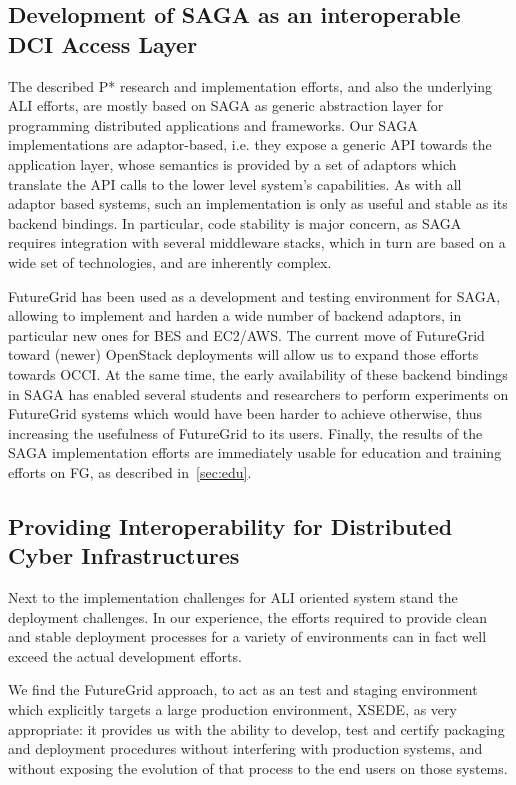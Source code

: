 \documentclass[]{paper}
\begin{document}
\subsection*{Development of SAGA as an interoperable DCI Access Layer}
\label{ssec:std_saga}

 The described P* research and implementation efforts, and also the
 underlying ALI efforts, are mostly based on SAGA as generic
 abstraction layer for programming distributed applications and
 frameworks.  Our SAGA implementations are adaptor-based, i.e. they
 expose a generic API towards the application layer, whose semantics
 is provided by a set of adaptors which translate the API calls to the
 lower level system's capabilities.  As with all adaptor based
 systems, such an implementation is only as useful and stable as its
 backend bindings.  In particular, code stability is major concern, as
 SAGA requires integration with several middleware stacks, which in
 turn are based on a wide set of technologies, and are inherently
 complex.

 FutureGrid has been used as a development and testing environment for
 SAGA, allowing to implement and harden a wide number of backend
 adaptors, in particular new ones for BES and EC2/AWS.  The current
 move of FutureGrid toward (newer) OpenStack deployments will allow us
 to expand those efforts towards OCCI.  At the same time, the early
 availability of these backend bindings in SAGA has enabled several
 students and researchers to perform experiments on FutureGrid systems
 which would have been harder to achieve otherwise, thus increasing
 the usefulness of FutureGrid to its users.  Finally, the results of
 the SAGA implementation efforts are immediately usable for education
 and training efforts on FG, as described in~\ref{sec:edu}.


\subsection*{Providing Interoperability for Distributed Cyber Infrastructures}
\label{ssec:std_xsede}

 Next to the implementation challenges for ALI oriented system stand
 the deployment challenges.  In our experience, the efforts
 required to provide clean and stable deployment processes for
 a variety of environments can in fact well exceed the actual development
 efforts.

 We find the FutureGrid approach, to act as an test and staging
 environment which explicitly targets a large production environment,
 XSEDE, as very appropriate: it provides us with the ability to
 develop, test and certify packaging and deployment procedures without
 interfering with production systems, and without exposing the
 evolution of that process to the end users on those systems.  
\end{document}
